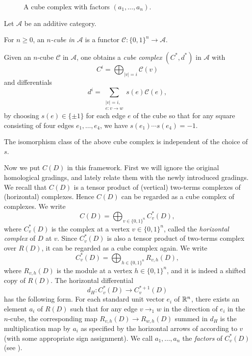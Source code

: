 \begin{figure}
    \centering
    
    \caption{A cube complex with factors $(a_1, \ldots, a_n)$.}
    \label{fig:cube-complex}
\end{figure}

Let $\mathcal{A}$ be an additive category.
\begin{definition}
    For $n \geq 0$, an \textit{$n$-cube in $\mathcal{A}$} is a functor $\mathcal{C}\colon \{0, 1\}^n \to \mathcal{A}$.
\end{definition}

Given an $n$-cube $\mathcal{C}$ in $\mathcal{A}$,
one obtains a \textit{cube complex} $(C^*, d^*)$ in $\mathcal{A}$ with 
\[
    C^i = \bigoplus_{|v| = i} \mathcal{C}(v)
\]
and differentials
\[
    d^i = \sum_{\substack{|v| = i,\\ e\colon v \to w}} s(e)\mathcal{C}(e),
\]
by choosing $s(e) \in \{\pm 1\}$ for each edge $e$ of the cube so that for any square consisting of four edges $e_1,\ldots,e_4$, we have $s(e_1) \cdots s(e_4) = -1$.

\begin{remark}
    The isomorphism class of the above cube complex is independent of the choice of $s$.
\end{remark}

Now we put $C(D)$ in this framework. First we will ignore the original homological gradings, and lately relate them with the newly introduced gradings. 
%
We recall that $C(D)$ is a tensor product of (vertical) two-terms complexes of (horizontal) complexes. Hence $C(D)$ can be regarded as a cube complex of complexes. We write 
\[
    C(D) = \bigoplus_{v \in \{0, 1\}^n} C^*_v(D),
\]
where $C^*_v(D)$ is the complex at a vertex $v \in \{0, 1\}^n$, called the \textit{horizontal complex} of $D$ at $v$.
Since $C^*_v(D)$ is also a tensor product of two-terms complex over $R(D)$, it can be regarded as a cube complex again. We write
\[
    C^*_v(D) = \bigoplus_{h \in \{0, 1\}^n} R_{v, h}(D),
\]
where $R_{v, h}(D)$ is the module at a vertex $h \in \{0, 1\}^n$, and it is indeed a shifted copy of $R(D)$. The horizontal differential 
\[
    d_H: C^*_v(D) \rightarrow C^{*+1}_v(D)
\]
has the following form.
For each standard unit vector $e_i$ of $\mathbb{R}^n$, there exists an element $a_i$ of $R(D)$ such that for any edge $v \to_1 w$ in the direction of $e_i$ in the $n$-cube, the corresponding map $R_{v,h}(D) \to R_{w,h}(D)$ summed in $d_H$ is the multiplication map by $a_i$ as specified by the horizontal arrows of  according to $v$ (with some appropriate sign assignment). We call $a_1, \ldots, a_n$ the \textit{factors} of $C^*_v(D)$ (see ).

